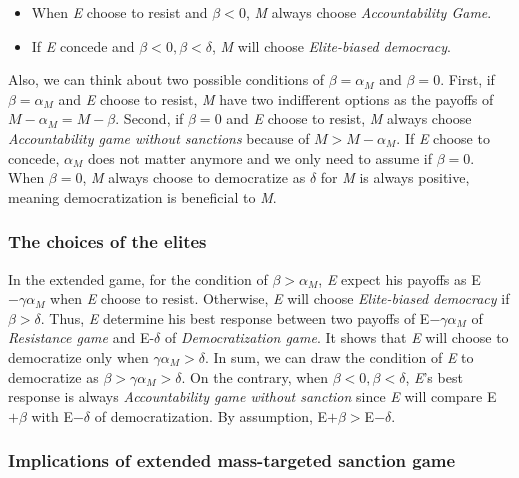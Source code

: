 \documentclass[11pt, letterpage]{article}
\begin{document}
\begin{itemize}
	\item When \textit{E} choose to resist and $\beta < 0$, \textit{M} always choose \textit{Accountability Game}.
	\item If \textit{E} concede and $\beta < 0, \beta < \delta$, \textit{M} will choose \textit{Elite-biased democracy}.
\end{itemize}

Also, we can think about two possible conditions of $\beta = \alpha_{M}$ and $\beta = 0$. First, if $\beta = \alpha_{M}$ and \textit{E} choose to resist, \textit{M} have two indifferent options as the payoffs of $M-\alpha_{M} = M-\beta$. Second, if $\beta = 0$ and \textit{E} choose to resist, \textit{M} always choose \textit{Accountability game without sanctions} because of $M > M-\alpha_{M}$. If \textit{E} choose to concede, $\alpha_{M}$ does not matter anymore and we only need to assume if $\beta = 0$. When $\beta = 0$, \textit{M} always choose to democratize as $\delta$ for \textit{M} is always positive, meaning democratization is beneficial to \textit{M}.

\subsubsection*{The choices of the elites}

In the extended game, for the condition of $\beta > \alpha_{M}$, \textit{E} expect his payoffs as E$-\gamma\alpha_{M}$ when \textit{E} choose to resist. Otherwise, \textit{E} will choose \textit{Elite-biased democracy} if $\beta > \delta$. Thus, \textit{E} determine his best response between two payoffs of E$-\gamma\alpha_{M}$ of \textit{Resistance game} and E-$\delta$ of \textit{Democratization game}. It shows that \textit{E} will choose to democratize only when $\gamma\alpha_{M} > \delta$. In sum, we can draw the condition of \textit{E} to democratize as $\beta > \gamma\alpha_{M} > \delta$.  On the contrary, when $\beta < 0, \beta < \delta$, \textit{E}'s best response is always \textit{Accountability game without sanction} since \textit{E} will compare E$+\beta$ with E$-\delta$ of democratization. By assumption, E$+\beta >$E$-\delta$.

\subsubsection*{Implications of extended mass-targeted sanction game}
\end{document}
